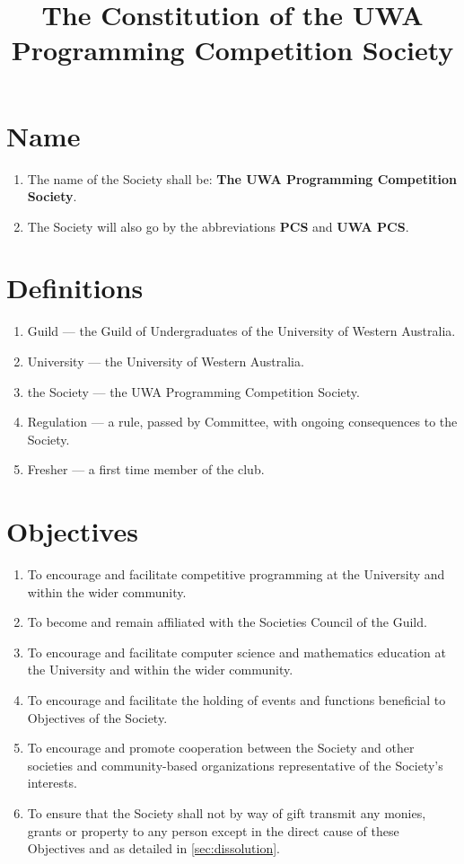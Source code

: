 \documentclass[a4paper]{article}
\begin{document}
\title{The Constitution of the UWA Programming Competition Society}
\date{}

\maketitle


\section{Name}
\begin{enumerate}
	\item The name of the Society shall be: \textbf{The UWA Programming Competition Society}.
    \item The Society will also go by the abbreviations \textbf{PCS} and \textbf{UWA PCS}.
\end{enumerate}


\section{Definitions}
\begin{enumerate}
    \item Guild --- the Guild of Undergraduates of the University of Western Australia.
    \item University --- the University of Western Australia.
    \item the Society --- the UWA Programming Competition Society.
    \item Regulation --- a rule, passed by Committee, with ongoing consequences to the Society.
    \item Fresher --- a first time member of the club.
\end{enumerate}


\section{Objectives} \label{sec:objectives}
\begin{enumerate}
    \item To encourage and facilitate competitive programming at the University and within the wider community.
    \item To become and remain affiliated with the Societies Council of the Guild.
    \item To encourage and facilitate computer science and mathematics education at the University and within the wider community.
    \item To encourage and facilitate the holding of events and functions beneficial to Objectives of the Society.
    \item To encourage and promote cooperation between the Society and other societies and community-based organizations representative of the Society's interests.
    \item To ensure that the Society shall not by way of gift transmit any monies, grants or property to any person except in the direct cause of these Objectives and as detailed in \cref{sec:dissolution}.
\end{enumerate}
\end{document}

